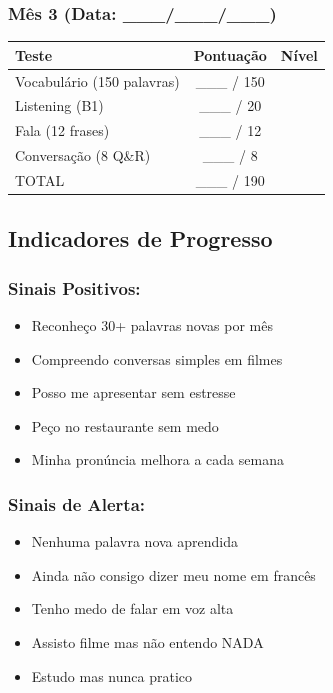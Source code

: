 \documentclass[a4paper,12pt]{article}
\begin{document}
\subsubsection{Mês 3 (Data: \_\_\_/\_\_\_/\_\_\_)}
\begin{tabular}{lcc}
    \toprule
    Teste & Pontuação & Nível \\
    \midrule
    Vocabulário (150 palavras) & \_\_\_ / 150 & \\
    Listening (B1) & \_\_\_ / 20 & \\
    Fala (12 frases) & \_\_\_ / 12 & \\
    Conversação (8 Q\&R) & \_\_\_ / 8 & \\
    TOTAL & \_\_\_ / 190 & \\
    \bottomrule
\end{tabular}

\subsection{Indicadores de Progresso}
\subsubsection*{Sinais Positivos:}
\begin{itemize}
    \item Reconheço 30+ palavras novas por mês
    \item Compreendo conversas simples em filmes
    \item Posso me apresentar sem estresse
    \item Peço no restaurante sem medo
    \item Minha pronúncia melhora a cada semana
\end{itemize}
\subsubsection*{Sinais de Alerta:}
\begin{itemize}
    \item Nenhuma palavra nova aprendida
    \item Ainda não consigo dizer meu nome em francês
    \item Tenho medo de falar em voz alta
    \item Assisto filme mas não entendo NADA
    \item Estudo mas nunca pratico
\end{itemize}

\end{document}
